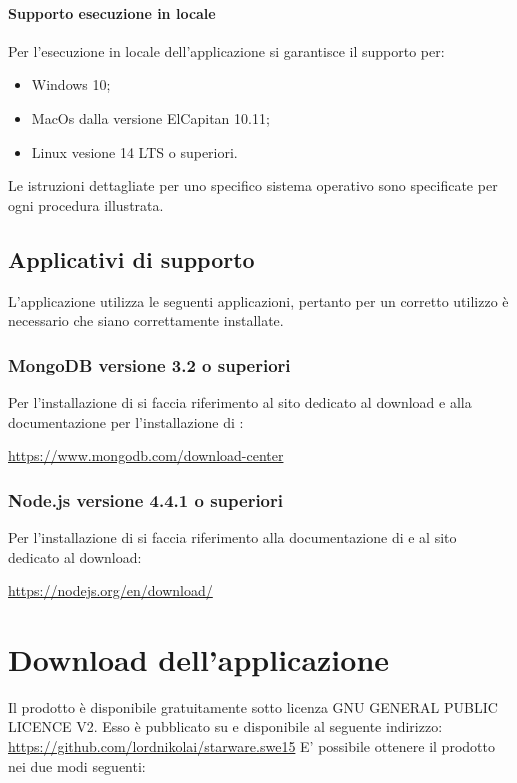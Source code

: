 \documentclass[12pt,a4paper]{article}
\begin{document}
	\paragraph{Supporto esecuzione in locale}
	Per l'esecuzione in locale  dell'applicazione si garantisce il supporto per:
		\begin{itemize}
			\item Windows 10;
			\item MacOs dalla versione ElCapitan 10.11;
			\item Linux vesione 14 LTS o superiori.
		\end{itemize}
	
	
	Le istruzioni dettagliate per uno specifico sistema operativo sono specificate per ogni procedura illustrata.
	
	\subsection{Applicativi di supporto}
	L'applicazione \prj{} utilizza le seguenti applicazioni, pertanto per un corretto utilizzo è necessario che siano correttamente installate.
	\subsubsection{MongoDB versione 3.2 o superiori}
	Per l'installazione di  si faccia riferimento al sito dedicato al download e alla documentazione per l'installazione di :
	\begin{center} \url{https://www.mongodb.com/download-center}
	\end{center}
	
	\subsubsection{Node.js versione 4.4.1 o superiori}
		Per l'installazione di  si faccia riferimento alla documentazione di  e al sito dedicato al download:
		\begin{center} \url{https://nodejs.org/en/download/} 
		\end{center}
	
	\section{Download dell'applicazione}\label{download}
	Il prodotto è disponibile gratuitamente sotto  licenza GNU GENERAL PUBLIC LICENCE V2. Esso è pubblicato
	su  e disponibile al seguente indirizzo: \url{https://github.com/lordnikolai/starware.swe15}
	E' possibile ottenere il prodotto nei due modi seguenti:
\end{document}
